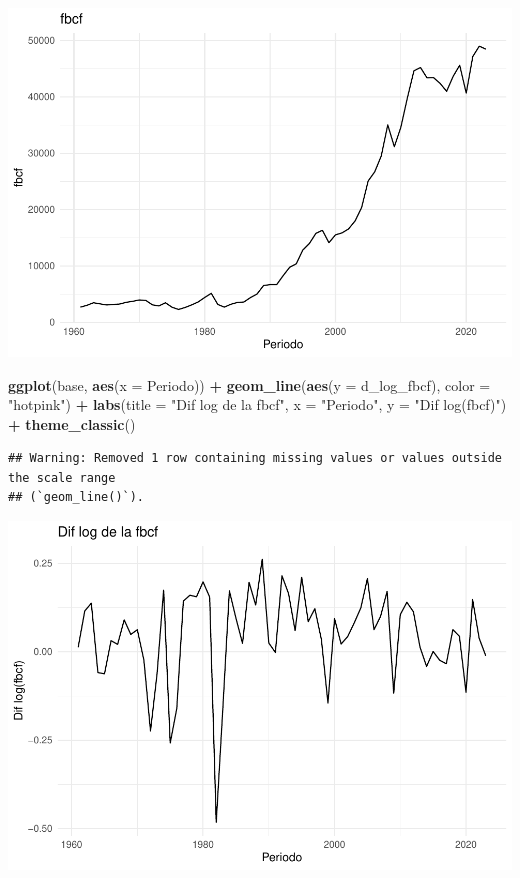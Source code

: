 \documentclass[
  12pt,
]{article}
\newenvironment{Shaded}{\begin{snugshade}}{\end{snugshade}}
\newcommand{\AttributeTok}[1]{\textcolor[rgb]{0.13,0.29,0.53}{#1}}
\newcommand{\FunctionTok}[1]{\textcolor[rgb]{0.13,0.29,0.53}{\textbf{#1}}}
\newcommand{\NormalTok}[1]{#1}
\newcommand{\SpecialCharTok}[1]{\textcolor[rgb]{0.81,0.36,0.00}{\textbf{#1}}}
\newcommand{\StringTok}[1]{\textcolor[rgb]{0.31,0.60,0.02}{#1}}
\begin{document}
\includegraphics{Ejercicio-4_files/figure-latex/unnamed-chunk-5-1.pdf}

\begin{Shaded}
\begin{Highlighting}[]
\FunctionTok{ggplot}\NormalTok{(base, }\FunctionTok{aes}\NormalTok{(}\AttributeTok{x =}\NormalTok{ Periodo)) }\SpecialCharTok{+}
  \FunctionTok{geom\_line}\NormalTok{(}\FunctionTok{aes}\NormalTok{(}\AttributeTok{y =}\NormalTok{ d\_log\_fbcf), }\AttributeTok{color =} \StringTok{"hotpink"}\NormalTok{) }\SpecialCharTok{+}
  \FunctionTok{labs}\NormalTok{(}\AttributeTok{title =} \StringTok{"Dif log de la fbcf"}\NormalTok{, }\AttributeTok{x =} \StringTok{"Periodo"}\NormalTok{, }\AttributeTok{y =} \StringTok{"Dif log(fbcf)"}\NormalTok{) }\SpecialCharTok{+}
  \FunctionTok{theme\_classic}\NormalTok{()}
\end{Highlighting}
\end{Shaded}

\begin{verbatim}
## Warning: Removed 1 row containing missing values or values outside the scale range
## (`geom_line()`).
\end{verbatim}

\includegraphics{Ejercicio-4_files/figure-latex/unnamed-chunk-6-1.pdf}
\end{document}
